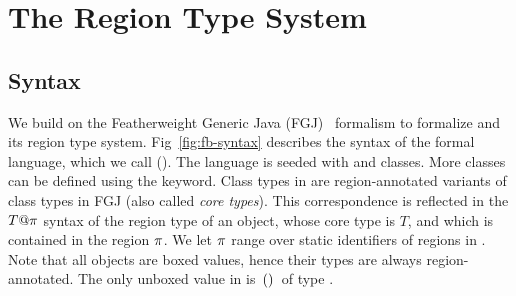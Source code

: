 \section{The Region Type System}
\label{sec:type-system}






\subsection{Syntax}
\label{sec:fb-syntax}

We build on the Featherweight Generic Java (FGJ)~\cite{fgj} formalism
to formalize \name and its region type system.
Fig~\ref{fig:fb-syntax} describes the syntax of the formal language,
which we call \fbname (\FB). The language is seeded with \ObjZ and
\RgnZ classes. More classes can be defined using the 
keyword. Class types in \FB are region-annotated variants of class
types in FGJ (also called \emph{core types}). This correspondence is
reflected in the $T@\pi$ syntax of the region type of an object,
whose core type is $T$, and which is contained in the region $\pi$.
We let $\pi$ range over static identifiers of regions in \FB. Note
that all \FB objects are boxed values, hence their \FB types are
always region-annotated. The only unboxed value in \FB is $\,{\tt ()}\,$
of type \unitZ.  

